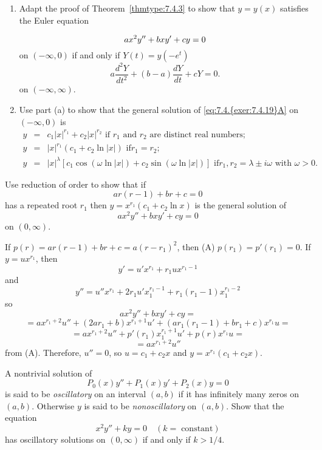 \documentclass{ximera}
\begin{document}
\begin{problem}\label{exer:7.4.19}
\begin{enumerate}
\item %
Adapt the proof of Theorem~\ref{thmtype:7.4.3} to show that  $y=y(x)$
satisfies the Euler equation

\begin{equation} \label{eq:7.4.{exer:7.4.19}A}
ax^2y''+bxy'+cy=0
\end{equation}
on $(-\infty,0)$
if and only if  $Y(t)=y(-e^t)$
$$
a \frac{d^2Y}{ dt^2}+(b-a)\frac{dY}{ dt}+cY=0.
$$
on   $(-\infty,\infty)$.
\item %
Use part (a)  to show that  the general solution of
\eqref{eq:7.4.{exer:7.4.19}A} on $(-\infty,0)$ is
\begin{eqnarray*}
y&=&c_1|x|^{r_1}+c_2|x|^{r_2}\mbox{ if $r_1$ and $r_2$ are distinct
real numbers;  }
\\ y&=&|x|^{r_1}(c_1+c_2\ln|x|)\mbox{ if
$r_1=r_2$;  }
\\ y&=&|x|^{\lambda}\left[c_1\cos\left(\omega\ln|x|\right)+
c_2\sin\left(\omega\ln|x| \right)\right]\mbox{ if
$r_1,r_2=\lambda\pm i\omega$ with $\omega>0$}.
\end{eqnarray*}
\end{enumerate}
\end{problem}

\begin{problem}\label{exer:7.4.20} Use reduction of order to show that if
$$
ar(r-1)+br+c=0
$$
has a repeated root $r_1$ then $y=x^{r_1}(c_1+c_2\ln x)$ is the
general solution of
$$
ax^2y''+bxy'+cy=0
$$
on $(0,\infty)$.

\begin{solution}
    If $p(r)=ar(r-1)+br+c=a(r-r_1)^2$, then (A) $p(r_1)=p'(r_1)=0$.
If $y=ux^{r_1}$, then $$y'=u'x^{r_1}+r_1ux^{r_1-1}$$
and $$y''=u''x^{r_1}+2r_1u'x_1^{r_1-1}+r_1(r_1-1)x_1^{r_1-2}$$ so
$$
ax^2y''+bxy'+cy=$$
$$=ax^{r_1+2}u''+(2ar_1+b)x^{r_1+1}u'
+\left(ar_1(r_1-1)+br_1+c\right)x^{r_1}u=$$
$$=ax^{r_1+2}u''+p'(r_1)x_1^{r_1+1}u'+p(r)x^{r_1}u=$$
$$=ax^{r_1+2}u''$$
from (A). Therefore, $u''=0$, so $u=c_1+c_2x$ and
$y=x^{r_1}(c_1+c_2x)$.
\end{solution}
\end{problem}

\begin{problem}\label{exer:7.4.21}
  A nontrivial solution of
$$
P_0(x)y''+P_1(x)y'+P_2(x)y=0
$$
is said to be {\color{blue}\it oscillatory} on an interval $(a,b)$ if it has infinitely
many zeros on $(a,b)$.  Otherwise $y$ is said to be {\color{blue}\it nonoscillatory\/}
on $(a,b)$.  Show that the equation
$$
x^2y''+ky=0 \quad (k=\; \mbox{constant})
$$
has oscillatory solutions on $(0,\infty)$ if and only if $k>1/4$.
\end{problem}
\end{document}
